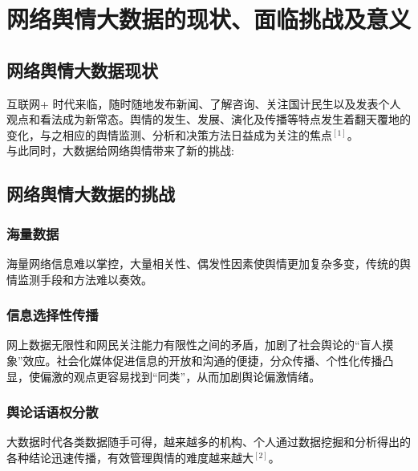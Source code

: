 \documentclass[11pt,a4paper,utf8]{article}
\begin{document}
\section{网络舆情大数据的现状、面临挑战及意义} 

{\color{red}{以下部分由王红阳书写整理}}
\subsection{网络舆情大数据现状}
互联网+ 时代来临，随时随地发布新闻、了解咨询、关注国计民生以及发表个人观点和看法成为新常态。舆情的发生、发展、演化及传播等特点发生着翻天覆地的变化，与之相应的舆情监测、分析和决策方法日益成为关注的焦点$^{[1]}$。\\

与此同时，大数据给网络舆情带来了新的挑战:

\subsection{网络舆情大数据的挑战} 
\subsubsection{海量数据}
海量网络信息难以掌控，大量相关性、偶发性因素使舆情更加复杂多变，传统的舆情监测手段和方法难以奏效。

\subsubsection{信息选择性传播}
网上数据无限性和网民关注能力有限性之间的矛盾，加剧了社会舆论的“盲人摸象”效应。社会化媒体促进信息的开放和沟通的便捷，分众传播、个性化传播凸显，使偏激的观点更容易找到“同类”，从而加剧舆论偏激情绪。 

\subsubsection{舆论话语权分散}
大数据时代各类数据随手可得，越来越多的机构、个人通过数据挖掘和分析得出的各种结论迅速传播，有效管理舆情的难度越来越大$^{[2]}$。 \\
\end{document}
